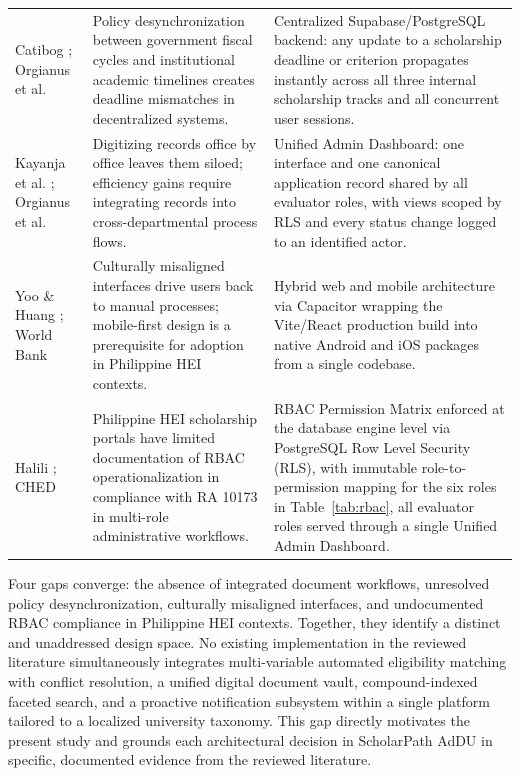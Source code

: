 \begin{table}[htbp]
\begin{tabular}{@{}p{3.0cm} p{5.4cm} p{5.4cm}@{}}
    \addlinespace
    Catibog \cite{ref16}; Orgianus et al. \cite{ref36} & Policy desynchronization between government fiscal cycles and institutional academic timelines creates deadline mismatches in decentralized systems. & Centralized Supabase/PostgreSQL backend: any update to a scholarship deadline or criterion propagates instantly across all three internal scholarship tracks and all concurrent user sessions. \\
    \addlinespace
    Kayanja et al. \cite{ref46}; Orgianus et al. \cite{ref36} & Digitizing records office by office leaves them siloed; efficiency gains require integrating records into cross-departmental process flows. & Unified Admin Dashboard: one interface and one canonical application record shared by all evaluator roles, with views scoped by RLS and every status change logged to an identified actor. \\
    \addlinespace
    Yoo \& Huang \cite{ref49}; World Bank \cite{ref48} & Culturally misaligned interfaces drive users back to manual processes; mobile-first design is a prerequisite for adoption in Philippine HEI contexts. & Hybrid web and mobile architecture via Capacitor wrapping the Vite/React production build into native Android and iOS packages from a single codebase. \\
    \addlinespace
    Halili \cite{ref26}; CHED \cite{ref18} & Philippine HEI scholarship portals have limited documentation of RBAC operationalization in compliance with RA 10173 in multi-role administrative workflows. & RBAC Permission Matrix enforced at the database engine level via PostgreSQL Row Level Security (RLS), with immutable role-to-permission mapping for the six roles in Table~\ref{tab:rbac}, all evaluator roles served through a single Unified Admin Dashboard. \\
    \bottomrule
  \end{tabular}
\end{table}
Four gaps converge: the absence of integrated document workflows, unresolved policy desynchronization, culturally misaligned interfaces, and undocumented RBAC compliance in Philippine HEI contexts. Together, they identify a distinct and unaddressed design space. No existing implementation in the reviewed literature simultaneously integrates multi-variable automated eligibility matching with conflict resolution, a unified digital document vault, compound-indexed faceted search, and a proactive notification subsystem within a single platform tailored to a localized university taxonomy. This gap directly motivates the present study and grounds each architectural decision in ScholarPath AdDU in specific, documented evidence from the reviewed literature.
